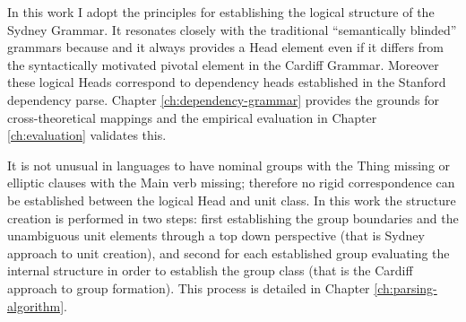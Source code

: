 


In this work I adopt the principles for establishing the logical structure of the Sydney Grammar. It resonates closely with the traditional ``semantically blinded'' grammars because and it always provides a Head element even if it differs from the syntactically motivated pivotal element in the Cardiff Grammar. Moreover these logical Heads correspond to dependency heads established in the Stanford dependency parse. Chapter \ref{ch:dependency-grammar} provides the grounds for cross-theoretical mappings and the empirical evaluation in Chapter \ref{ch:evaluation} validates this.

It is not unusual in languages to have nominal groups with the Thing missing or elliptic clauses with the Main verb missing; therefore no rigid correspondence can be established between the logical Head and unit class. 
In this work the structure creation is performed in two steps: first establishing the group boundaries and the unambiguous unit elements through a top down perspective (that is Sydney approach to unit creation), and second for each established group evaluating the internal structure in order to establish the group class (that is the Cardiff approach to group formation). This process is detailed in Chapter \ref{ch:parsing-algorithm}.

